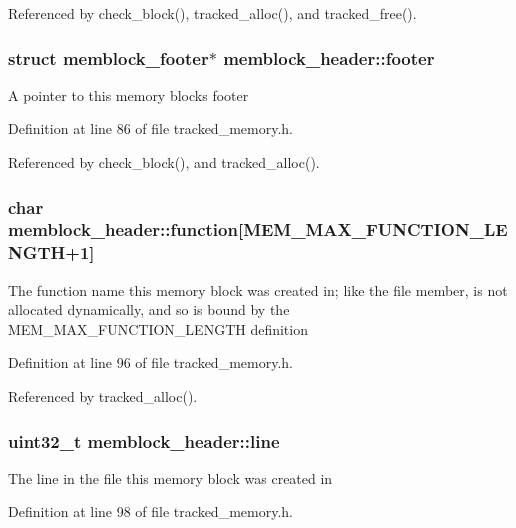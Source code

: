 Referenced by check\-\_\-block(), tracked\-\_\-alloc(), and tracked\-\_\-free().

\subsubsection[{footer}]{\setlength{\rightskip}{0pt plus 5cm}struct {\bf memblock\-\_\-footer}$\ast$ memblock\-\_\-header\-::footer}\label{structmemblock__header_a21ce1e9005809a1f4ac9d9fc16f0ccc6}
A pointer to this memory blocks footer 

Definition at line 86 of file tracked\-\_\-memory.\-h.



Referenced by check\-\_\-block(), and tracked\-\_\-alloc().

\subsubsection[{function}]{\setlength{\rightskip}{0pt plus 5cm}char memblock\-\_\-header\-::function\mbox{[}{\bf M\-E\-M\-\_\-\-M\-A\-X\-\_\-\-F\-U\-N\-C\-T\-I\-O\-N\-\_\-\-L\-E\-N\-G\-T\-H}+1\mbox{]}}\label{structmemblock__header_ab3a09c5ab1300cb51e93ff910431c40f}
The function name this memory block was created in; like the file member, is not allocated dynamically, and so is bound by the M\-E\-M\-\_\-\-M\-A\-X\-\_\-\-F\-U\-N\-C\-T\-I\-O\-N\-\_\-\-L\-E\-N\-G\-T\-H definition 

Definition at line 96 of file tracked\-\_\-memory.\-h.



Referenced by tracked\-\_\-alloc().

\subsubsection[{line}]{\setlength{\rightskip}{0pt plus 5cm}uint32\-\_\-t memblock\-\_\-header\-::line}\label{structmemblock__header_aa2bb67f4837cf735956c591e23e4c800}
The line in the file this memory block was created in 

Definition at line 98 of file tracked\-\_\-memory.\-h.



